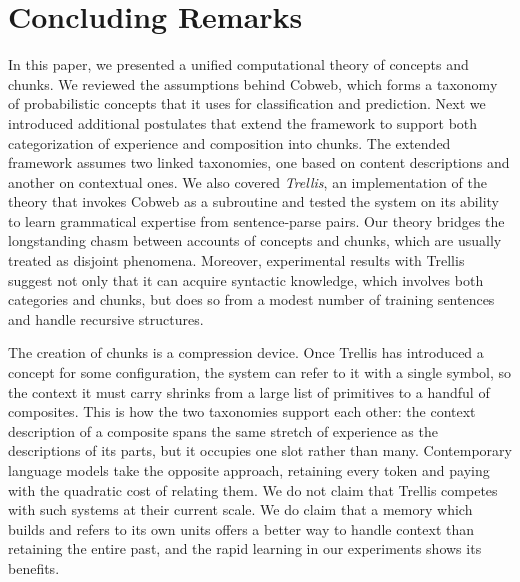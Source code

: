 \documentclass[11pt,letterpaper]{article}
\def\trellis/{{\sc Trellis}}
\begin{document}
\section{Concluding Remarks}

In this paper, we presented a unified computational theory of concepts
and chunks. We reviewed the assumptions behind Cobweb, which forms a
taxonomy of probabilistic concepts that it uses for classification and
prediction. Next we introduced additional postulates that extend the
framework to support both categorization of experience and composition
into chunks. The extended framework assumes two linked taxonomies, one
based on content descriptions and another on contextual ones. We also
covered {\sl Trellis}, an implementation of the theory that invokes
Cobweb as a subroutine and tested the system on its ability to learn
grammatical expertise from sentence-parse pairs. 
Our theory bridges the longstanding chasm between accounts of concepts
and chunks, which are usually treated as disjoint phenomena. Moreover,
experimental results with \trellis/ suggest not only that it can acquire
syntactic knowledge, which involves both categories and chunks, but
does so from a modest number of training sentences and handle recursive 
structures. 


The creation of chunks is a compression device. Once \trellis/ has 
introduced a concept for some configuration, the system can refer to 
it with a single symbol, so the context it must carry shrinks from 
a large list of primitives to a handful of composites. This is how  
the two taxonomies support each other: the context description of a 
composite spans the same stretch of experience as the descriptions 
of its parts, but it occupies one slot rather than many. Contemporary 
language models take the opposite approach, retaining every token and 
paying with the quadratic cost of relating them. We do not claim that 
\trellis/ competes with such systems at their current scale. We do
claim that a memory which builds and refers to its own units offers 
a better way to handle context than retaining the entire past, and 
the rapid learning in our experiments shows its benefits.
\end{document}
